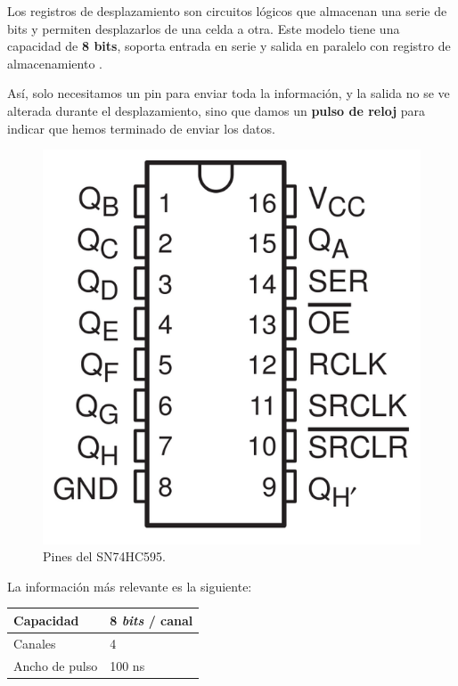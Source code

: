 Los registros de desplazamiento son circuitos lógicos que almacenan una serie de bits y permiten desplazarlos de una celda a otra. Este modelo tiene una capacidad de \textbf{8 bits}, soporta entrada en serie y salida en paralelo con registro de almacenamiento \cite{shiftreg}. 

Así, solo necesitamos un pin para enviar toda la información, y la salida no se ve alterada durante el desplazamiento, sino que damos un \textbf{pulso de reloj} para indicar que hemos terminado de enviar los datos.

\smallskip

\begin{figure}[H]
	\noindent \begin{centering}
		\includegraphics[width=\linewidth/4]{capitulo3/SN74HC595}
		\par\end{centering}
	\smallskip
	\caption{\label{fig:SN74HC595} Pines del SN74HC595. }
\end{figure} 

\smallskip

La información más relevante es la siguiente:

\smallskip

\begin{center}
		\begin{tabular}{|l|l|}
		\hline Capacidad & 8 \textit{bits} / canal \\ 
		\hline Canales & 4 \\ 
		\hline Ancho de pulso & 100 ns \\ 
		\hline 
	\end{tabular}
	\smallskip
\end{center}

